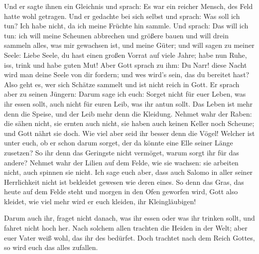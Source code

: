  Und er sagte ihnen ein Gleichnis und sprach: Es war ein
reicher Mensch, des Feld hatte wohl getragen.  Und er
gedachte bei sich selbst und sprach: Was soll ich tun? Ich habe nicht,
da ich meine Früchte hin sammle.  Und sprach: Das will
ich tun: ich will meine Scheunen abbrechen und größere bauen und will
drein sammeln alles, was mir gewachsen ist, und meine Güter;
 und will sagen zu meiner Seele: Liebe Seele, du hast
einen großen Vorrat auf viele Jahre; habe nun Ruhe, iss, trink und habe
guten Mut!  Aber Gott sprach zu ihm: Du Narr! diese Nacht
wird man deine Seele von dir fordern; und wes wird's sein, das du
bereitet hast?  Also geht es, wer sich Schätze sammelt
und ist nicht reich in Gott.  Er sprach aber zu seinen
Jüngern: Darum sage ich euch: Sorget nicht für euer Leben, was ihr essen
sollt, auch nicht für euren Leib, was ihr antun sollt. 
Das Leben ist mehr denn die Speise, und der Leib mehr denn die Kleidung.
 Nehmet wahr der Raben: die sähen nicht, sie ernten auch
nicht, sie haben auch keinen Keller noch Scheune; und Gott nährt sie
doch. Wie viel aber seid ihr besser denn die Vögel! 
Welcher ist unter euch, ob er schon darum sorget, der da könnte eine
Elle seiner Länge zusetzen?  So ihr denn das Geringste
nicht vermöget, warum sorgt ihr für das andere?  Nehmet
wahr der Lilien auf dem Felde, wie sie wachsen: sie arbeiten nicht, auch
spinnen sie nicht. Ich sage euch aber, dass auch Salomo in aller seiner
Herrlichkeit nicht ist bekleidet gewesen wie deren eines.
 So denn das Gras, das heute auf dem Felde steht und
morgen in den Ofen geworfen wird, Gott also kleidet, wie viel mehr wird
er euch kleiden, ihr Kleingläubigen!

 Darum auch ihr, fraget nicht danach, was ihr essen oder
was ihr trinken sollt, und fahret nicht hoch her.  Nach
solchem allen trachten die Heiden in der Welt; aber euer Vater weiß
wohl, das ihr des bedürfet.  Doch trachtet nach dem Reich
Gottes, so wird euch das alles zufallen.

